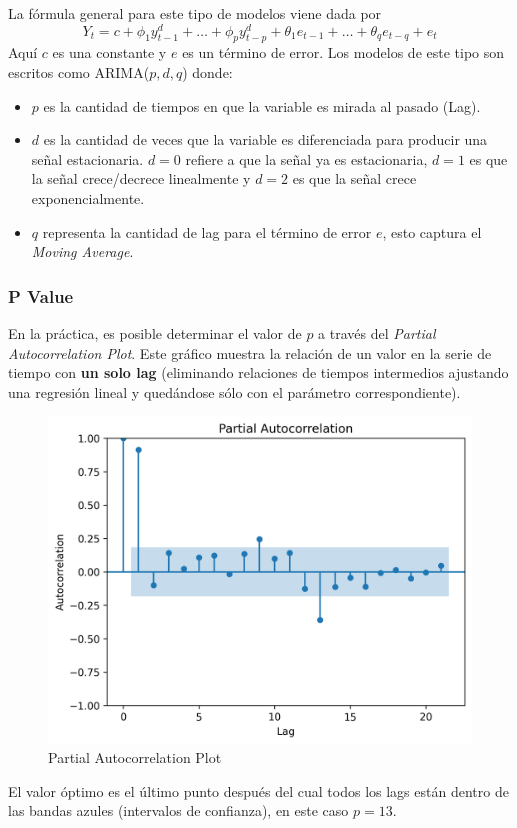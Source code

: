 La fórmula general para este tipo de modelos viene dada por 
$$
Y_t = c + \phi_1y^d_{t-1} + \dots + \phi_py^d_{t-p} + \theta_1e_{t-1} + \dots + \theta_q e_{t-q} + e_t
$$
Aquí $c$ es una constante y $e$ es un término de error. Los modelos de este tipo son escritos como ARIMA($p,d,q$) donde: 

\begin{itemize}
    \item $p$ es la cantidad de tiempos en que la variable es mirada al pasado (Lag).
    \item $d$ es la cantidad de veces que la variable es diferenciada para producir una señal estacionaria. $d=0$ refiere a que la señal ya es estacionaria, $d=1$ es que la señal crece/decrece linealmente y $d=2$ es que la señal crece exponencialmente. 
    \item $q$ representa la cantidad de lag para el término de error $e$, esto captura el \textit{Moving Average}.
\end{itemize}

\subsubsection{P Value}

En la práctica, es posible determinar el valor de $p$ a través del \textit{Partial Autocorrelation Plot}. Este gráfico muestra la relación de un valor en la serie de tiempo con \textbf{un solo lag} (eliminando relaciones de tiempos intermedios ajustando una regresión lineal y quedándose sólo con el parámetro correspondiente).
\begin{figure}[H]
    \center
    \includegraphics[scale=0.5]{notebooks/ML/img/partial_autocorrelation.png}
    \caption{Partial Autocorrelation Plot}
\end{figure}
El valor óptimo es el último punto después del cual todos los lags están dentro de las bandas azules (intervalos de confianza), en este caso $p=13$. 


